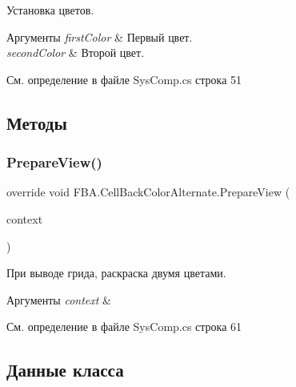 Установка цветов. 


\begin{DoxyParams}{Аргументы}
{\em first\+Color} & Первый цвет.\\
\hline
{\em second\+Color} & Второй цвет.\\
\hline
\end{DoxyParams}


См. определение в файле Sys\+Comp.\+cs строка 51



\subsection{Методы}
\mbox{\label{class_f_b_a_1_1_cell_back_color_alternate_a05cad53599b4418cd81e2901c07efa35}} 
\subsubsection{\texorpdfstring{Prepare\+View()}{PrepareView()}}
{\footnotesize\ttfamily override void F\+B\+A.\+Cell\+Back\+Color\+Alternate.\+Prepare\+View (\begin{DoxyParamCaption}\item[{Source\+Grid.\+Cell\+Context}]{context }\end{DoxyParamCaption})\hspace{0.3cm}{\ttfamily [protected]}}



При выводе грида, раскраска двумя цветами. 


\begin{DoxyParams}{Аргументы}
{\em context} & \\
\hline
\end{DoxyParams}


См. определение в файле Sys\+Comp.\+cs строка 61



\subsection{Данные класса}
\mbox{\label{class_f_b_a_1_1_cell_back_color_alternate_a473698a7200e4a968dcbac7f8aa2f44b}} 
